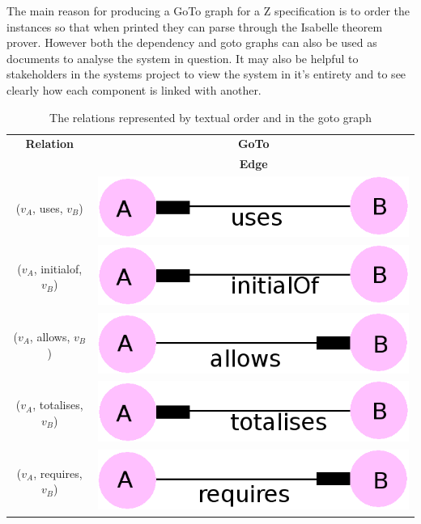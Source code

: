  The main reason for producing
a GoTo graph for a Z specification is to order the instances so that when printed they can parse
through the Isabelle theorem prover. However both the dependency and goto graphs
can also be used as documents to analyse the system in question. It may also be
helpful to stakeholders in the systems project to view the system in it's
entirety and to see clearly how each component is linked with another.

\begin{table}[H]
\centering
\begin{tabular}{| c | c |}
\hline
\textbf{Relation} & \textbf{GoTo} \\
 & \textbf{Edge} \\
\hline
($v_{A}$, uses, $v_{B}$) & 
\includegraphics[scale=0.15]{Figures/Formalising/uses.png} \\
\hline
($v_{A}$, initialof, $v_{B}$) & 
\includegraphics[scale=0.15]{Figures/Formalising/initialof.png} \\
\hline
($v_{A}$, allows, $v_{B}$) & 
\includegraphics[scale=0.15]{Figures/Formalising/allows.png} \\
\hline
($v_{A}$, totalises, $v_{B}$) & 
\includegraphics[scale=0.15]{Figures/Formalising/totalises.png} \\
\hline
($v_{A}$, requires, $v_{B}$) & 
\includegraphics[scale=0.15]{Figures/Formalising/requires.png} \\
\hline
\end{tabular}
\caption{The relations represented by textual order and in the goto graph \label{tab:gotorelations}}
\end{table}

